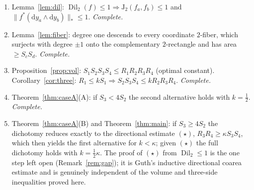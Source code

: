 \documentclass[11pt]{article}
\theoremstyle{remark}
\newcommand{\Dil}{\operatorname{Dil}}
\newcommand{\comass}[1]{\lVert #1 \rVert_{*}}
\newcommand{\dd}{\mathrm{d}}
\newcommand{\Jac}{\mathrm{J}}
\begin{document}
\begin{enumerate}
\item[(I)] Lemma~\ref{lem:dil}: $\Dil_2(f)\le1\Rightarrow\Jac_2(f_a,f_b)\le1$ and
$\comass{f^*(\dd y_a\wedge \dd y_b)}\le1$. \emph{Complete.}
\item[(II)] Lemma~\ref{lem:fiber}: degree one descends to every coordinate $2$-fiber, which
surjects with degree $\pm1$ onto the complementary $2$-rectangle and has area $\ge S_cS_d$.
\emph{Complete.}
\item[(III)] Proposition~\ref{prop:vol}: $S_1S_2S_3S_4\le R_1R_2R_3R_4$ (optimal constant).
Corollary~\ref{cor:three}: $R_1\le kS_1\Rightarrow S_2S_3S_4\le kR_2R_3R_4$. \emph{Complete.}
\item[(IV)] Theorem~\ref{thm:caseA}(A): if $S_3<4S_2$ the second alternative holds with
$k=\tfrac12$. \emph{Complete.}
\item[(V)] Theorem~\ref{thm:caseA}(B) and Theorem~\ref{thm:main}: if $S_3\ge4S_2$ the
dichotomy reduces exactly to the directional estimate $(\star)$, $R_3R_4\ge\kappa S_3S_4$,
which then yields the first alternative for $k<\kappa$; given $(\star)$ the full dichotomy
holds with $k=\tfrac12\kappa$. The proof of $(\star)$ from $\Dil_2\le1$ is the one step left
open (Remark~\ref{rem:gap}); it is Guth's inductive directional coarea estimate and is
genuinely independent of the volume and three-side inequalities proved here.
\end{enumerate}
\end{document}
